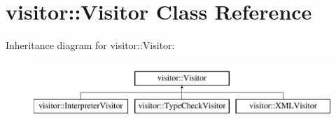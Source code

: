 \hypertarget{classvisitor_1_1Visitor}{}\section{visitor\+:\+:Visitor Class Reference}
\label{classvisitor_1_1Visitor}
Inheritance diagram for visitor\+:\+:Visitor\+:\begin{figure}[H]
\begin{center}
\leavevmode
\includegraphics[height=2.000000cm]{df/d8f/classvisitor_1_1Visitor}
\end{center}
\end{figure}
